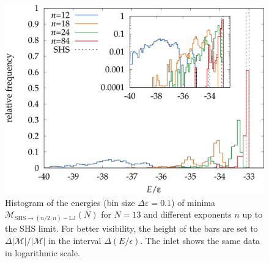 \begin{figure}
    \centering
    \includegraphics[width=0.8\columnwidth]{kslj/N13-steps.pdf}
    \caption{Histogram of the energies (bin size $\Delta\varepsilon=0.1$) of
    minima $\mathcal{M}_{\text{SHS}\to (n/2,n)-\text{LJ}}(N)$ for $N=13$ and
    different exponents $n$ up to the \acs{SHS} limit. For better visibility, the
    height of the bars are set to $\Delta|\mathcal{M}|/|\mathcal{M}|$ in the
    interval $\Delta(E/\epsilon)$. The inlet shows the same data in logarithmic
    scale.}
    \label{fig:N13-steps}
\end{figure}




